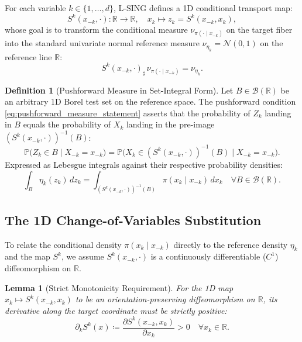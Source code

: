 \documentclass[11pt,a4paper]{article}
\theoremstyle{plain}
\newtheorem{lemma}[theorem]{Lemma}
\theoremstyle{definition}
\newtheorem{definition}[theorem]{Definition}
\theoremstyle{remark}
\begin{document}
For each variable $k \in \{1, \dots, d\}$, L-SING defines a 1D conditional transport map:
\begin{equation}
    S^k(x_{-k}, \cdot): \mathbb{R} \to \mathbb{R}, \quad x_k \mapsto z_k = S^k(x_{-k}, x_k),
\end{equation}
whose goal is to transform the conditional measure $\nu_{\pi(\cdot \mid x_{-k})}$ on the target fiber into the standard univariate normal reference measure $\nu_{\eta_k} = \mathcal{N}(0, 1)$ on the reference line $\mathbb{R}$:
\begin{equation}
    S^k(x_{-k}, \cdot)_\sharp \, \nu_{\pi(\cdot \mid x_{-k})} = \nu_{\eta_k}.
    \label{eq:pushforward_measure_statement}
\end{equation}

\begin{definition}[Pushforward Measure in Set-Integral Form]
Let $B \in \mathcal{B}(\mathbb{R})$ be an arbitrary 1D Borel test set on the reference space. The pushforward condition \eqref{eq:pushforward_measure_statement} asserts that the probability of $Z_k$ landing in $B$ equals the probability of $X_k$ landing in the pre-image $(S^k(x_{-k}, \cdot))^{-1}(B)$:
\begin{equation}
    \mathbb{P}\Big( Z_k \in B \;\Big|\; X_{-k} = x_{-k} \Big) = \mathbb{P}\Big( X_k \in (S^k(x_{-k}, \cdot))^{-1}(B) \;\Big|\; X_{-k} = x_{-k} \Big).
\end{equation}
Expressed as Lebesgue integrals against their respective probability densities:
\begin{equation}
    \int_B \eta_k(z_k) \, dz_k = \int_{(S^k(x_{-k}, \cdot))^{-1}(B)} \pi(x_k \mid x_{-k}) \, dx_k \quad \forall B \in \mathcal{B}(\mathbb{R}).
    \label{eq:integral_equality_fundamental}
\end{equation}
\end{definition}

\subsection{The 1D Change-of-Variables Substitution}

To relate the conditional density $\pi(x_k \mid x_{-k})$ directly to the reference density $\eta_k$ and the map $S^k$, we assume $S^k(x_{-k}, \cdot)$ is a continuously differentiable ($C^1$) diffeomorphism on $\mathbb{R}$.

\begin{lemma}[Strict Monotonicity Requirement]
For the 1D map $x_k \mapsto S^k(x_{-k}, x_k)$ to be an orientation-preserving diffeomorphism on $\mathbb{R}$, its derivative along the target coordinate must be strictly positive:
\begin{equation}
    \partial_k S^k(x) \coloneqq \frac{\partial S^k(x_{-k}, x_k)}{\partial x_k} > 0 \quad \forall x_k \in \mathbb{R}.
\end{equation}
\end{lemma}
\end{document}
